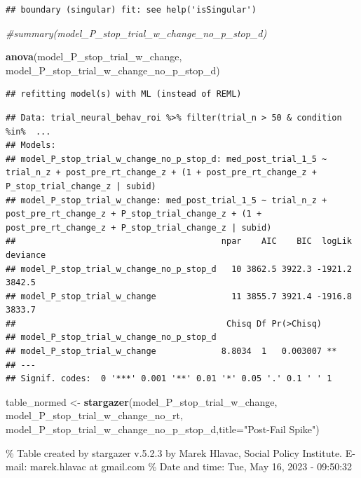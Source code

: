 \documentclass[
]{article}
\newenvironment{Shaded}{\begin{snugshade}}{\end{snugshade}}
\newcommand{\CommentTok}[1]{\textcolor[rgb]{0.56,0.35,0.01}{\textit{#1}}}
\newcommand{\DataTypeTok}[1]{\textcolor[rgb]{0.13,0.29,0.53}{#1}}
\newcommand{\KeywordTok}[1]{\textcolor[rgb]{0.13,0.29,0.53}{\textbf{#1}}}
\newcommand{\NormalTok}[1]{#1}
\newcommand{\StringTok}[1]{\textcolor[rgb]{0.31,0.60,0.02}{#1}}
\begin{document}
\begin{verbatim}
## boundary (singular) fit: see help('isSingular')
\end{verbatim}

\begin{Shaded}
\begin{Highlighting}[]
\CommentTok{#summary(model_P_stop_trial_w_change_no_p_stop_d)}


\KeywordTok{anova}\NormalTok{(model_P_stop_trial_w_change, model_P_stop_trial_w_change_no_p_stop_d)}
\end{Highlighting}
\end{Shaded}

\begin{verbatim}
## refitting model(s) with ML (instead of REML)
\end{verbatim}

\begin{verbatim}
## Data: trial_neural_behav_roi %>% filter(trial_n > 50 & condition %in%  ...
## Models:
## model_P_stop_trial_w_change_no_p_stop_d: med_post_trial_1_5 ~ trial_n_z + post_pre_rt_change_z + (1 + post_pre_rt_change_z + P_stop_trial_change_z | subid)
## model_P_stop_trial_w_change: med_post_trial_1_5 ~ trial_n_z + post_pre_rt_change_z + P_stop_trial_change_z + (1 + post_pre_rt_change_z + P_stop_trial_change_z | subid)
##                                         npar    AIC    BIC  logLik deviance
## model_P_stop_trial_w_change_no_p_stop_d   10 3862.5 3922.3 -1921.2   3842.5
## model_P_stop_trial_w_change               11 3855.7 3921.4 -1916.8   3833.7
##                                          Chisq Df Pr(>Chisq)   
## model_P_stop_trial_w_change_no_p_stop_d                        
## model_P_stop_trial_w_change             8.8034  1   0.003007 **
## ---
## Signif. codes:  0 '***' 0.001 '**' 0.01 '*' 0.05 '.' 0.1 ' ' 1
\end{verbatim}

\begin{Shaded}
\begin{Highlighting}[]
\NormalTok{table_normed <-}\StringTok{ }\KeywordTok{stargazer}\NormalTok{(model_P_stop_trial_w_change, model_P_stop_trial_w_change_no_rt, model_P_stop_trial_w_change_no_p_stop_d,}\DataTypeTok{title=}\StringTok{"Post-Fail Spike"}\NormalTok{)}
\end{Highlighting}
\end{Shaded}

\% Table created by stargazer v.5.2.3 by Marek Hlavac, Social Policy
Institute. E-mail: marek.hlavac at gmail.com \% Date and time: Tue, May
16, 2023 - 09:50:32
\end{document}
